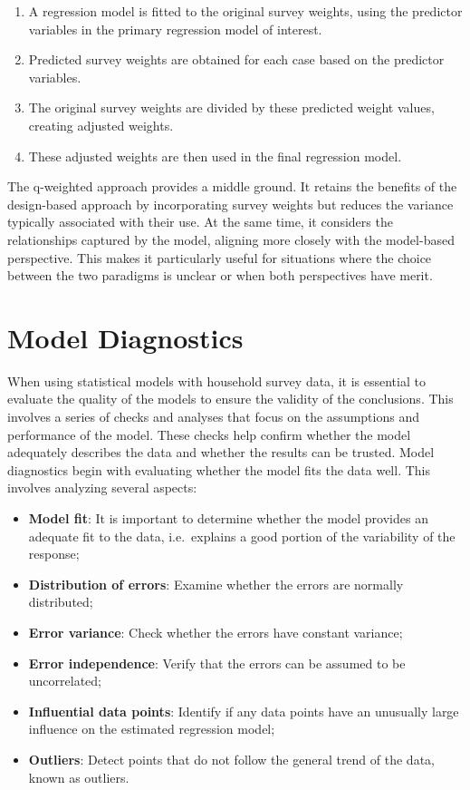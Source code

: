 \documentclass[
  12pt,
]{book}
\begin{document}
\begin{enumerate}
\def\labelenumi{\arabic{enumi}.}
\item
  A regression model is fitted to the original survey weights, using the predictor variables in the primary regression model of interest.
\item
  Predicted survey weights are obtained for each case based on the predictor variables.
\item
  The original survey weights are divided by these predicted weight values, creating adjusted weights.
\item
  These adjusted weights are then used in the final regression model.
\end{enumerate}

The q-weighted approach provides a middle ground. It retains the benefits of the design-based approach by incorporating survey weights but reduces the variance typically associated with their use. At the same time, it considers the relationships captured by the model, aligning more closely with the model-based perspective. This makes it particularly useful for situations where the choice between the two paradigms is unclear or when both perspectives have merit.

\hypertarget{model-diagnostics}{%
\section{Model Diagnostics}\label{model-diagnostics}}

When using statistical models with household survey data, it is essential to evaluate the quality of the models to ensure the validity of the conclusions. This involves a series of checks and analyses that focus on the assumptions and performance of the model. These checks help confirm whether the model adequately describes the data and whether the results can be trusted. Model diagnostics begin with evaluating whether the model fits the data well. This involves analyzing several aspects:

\begin{itemize}
\item
  \textbf{Model fit}: It is important to determine whether the model provides an adequate fit to the data, i.e.~explains a good portion of the variability of the response;
\item
  \textbf{Distribution of errors}: Examine whether the errors are normally distributed;
\item
  \textbf{Error variance}: Check whether the errors have constant variance;
\item
  \textbf{Error independence}: Verify that the errors can be assumed to be uncorrelated;
\item
  \textbf{Influential data points}: Identify if any data points have an unusually large influence on the estimated regression model;
\item
  \textbf{Outliers}: Detect points that do not follow the general trend of the data, known as outliers.
\end{itemize}
\end{document}
